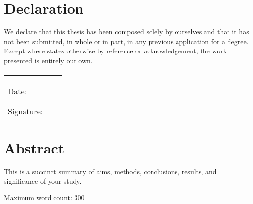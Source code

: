 
\cleardoublepage  %

\section*{Declaration}
We declare that this thesis has been composed solely by ourselves and that it has not been submitted, in whole or in part, in any previous application for a degree. 
Except where states otherwise by reference or acknowledgement, the work presented is entirely our
own.

\paragraph{}
\begin{tabular}{lcc}

	& \AuthorA & \AuthorB \\
	& \AuthorAID & \AuthorBID \\
	
	& & \\ %
	
	Date: &  \dotfill & \dotfill \\ 
	
	& & \\ %
	& & \\ %
	
	Signature: & \dotfill & \dotfill \\ 
	
\end{tabular}

\cleardoublepage  %
\section*{Abstract}

This is a succinct summary of aims, methods, conclusions, results, and significance of your study. 

Maximum word count: 300

\cleardoublepage  %
